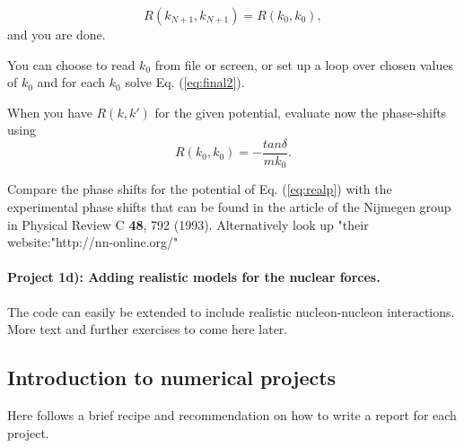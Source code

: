 \documentclass[%
oneside,                 %
final,                   %
10pt]{article}
\begin{document}
\begin{equation}
      R(k_{N+1},k_{N+1})=R(k_0,k_0),
\end{equation}
and you are done.

You can choose to read $k_0$ from file or screen, or set up
a loop over chosen values of $k_0$ and for each
$k_0$ solve Eq. (\ref{eq:final2}). 




When you have $R(k,k')$ for the given potential, evaluate now the phase-shifts  using
\begin{equation*}
R(k_0,k_0)=-\frac{tan\delta}{mk_0}.
\end{equation*}

Compare the phase shifts for the potential of Eq. (\ref{eq:realp}) with the  experimental phase shifts that can be found  in the article  of the Nijmegen group in Physical Review C \textbf{48}, 792 (1993).  Alternatively look up "their website:"http://nn-online.org/"


\paragraph{Project 1d): Adding realistic models for the nuclear forces.}
The code can easily be extended to include realistic nucleon-nucleon interactions. More text and further exercises to come here later.







\subsection*{Introduction to numerical projects}

Here follows a brief recipe and recommendation on how to write a report for each
project.
\end{document}
